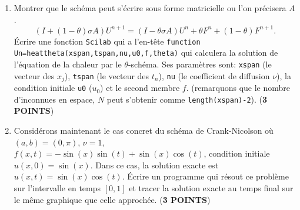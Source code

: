 \documentclass[12pt,a4paper]{article}
\begin{document}
\begin{enumerate}
\item Montrer que le sch\'ema peut s'\'ecrire sous forme matricielle
  ou l'on pr\'ecisera $A$.
$$
(I+(1-\theta)\sigma A)U^{n+1}= (I-\theta\sigma A)U^{n}+\theta
F^n+(1-\theta) F^{n+1}.
$$
\'Ecrire une fonction \texttt{Scilab} qui a l'en-t\^ete
  \texttt{function Un=heattheta(xspan,tspan,nu,u0,f,theta)} qui
  calculera la solution de l'\'equation de la chaleur par le
  $\theta$-sch\'ema. Ses param\`etres sont: \texttt{xspan} (le vecteur des $x_j$),
  \texttt{tspan} (le vecteur des $t_n$), \texttt{nu} (le coefficient de
  diffusion $\nu$), la condition initiale \texttt{u0} ($u_0$) et le
  second membre $f$. (remarquons que le nombre d'inconnues en espace, $N$ peut
  s'obtenir comme \texttt{length(xspan)-2}). ({\bf 3 POINTS})
\vspace{10cm}

\item Consid\'erons maintenant le cas concret du sch\'ema de
  Crank-Nicolson o\`u $(a,b) = (0,\pi)$,
  $\nu= 1$, $f (x, t) = -\sin(x) \sin(t) + \sin(x)\cos(t)$, condition
  initiale $u(x, 0) = \sin(x)$. Dans ce cas, la solution exacte est
  $u(x,t) = \sin(x)\cos(t)$. \'Ecrire un programme qui r\'esout ce probl\`eme sur
  l'intervalle en temps $[0,1]$ et tracer la solution exacte au temps
  final sur le m\^eme graphique que celle approch\'ee. ({\bf 3 POINTS})
\end{enumerate}
\end{document}
